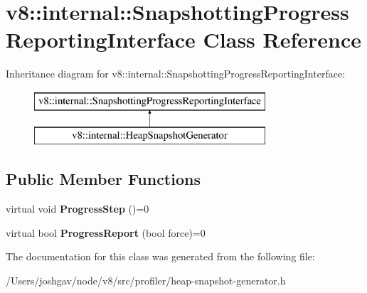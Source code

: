 \hypertarget{classv8_1_1internal_1_1_snapshotting_progress_reporting_interface}{}\section{v8\+:\+:internal\+:\+:Snapshotting\+Progress\+Reporting\+Interface Class Reference}
\label{classv8_1_1internal_1_1_snapshotting_progress_reporting_interface}
Inheritance diagram for v8\+:\+:internal\+:\+:Snapshotting\+Progress\+Reporting\+Interface\+:\begin{figure}[H]
\begin{center}
\leavevmode
\includegraphics[height=2.000000cm]{classv8_1_1internal_1_1_snapshotting_progress_reporting_interface}
\end{center}
\end{figure}
\subsection*{Public Member Functions}
\begin{DoxyCompactItemize}
\item 
virtual void {\bfseries Progress\+Step} ()=0\hypertarget{classv8_1_1internal_1_1_snapshotting_progress_reporting_interface_abdd2a80e9a6dbbcfc3f8e510444c7acd}{}\label{classv8_1_1internal_1_1_snapshotting_progress_reporting_interface_abdd2a80e9a6dbbcfc3f8e510444c7acd}

\item 
virtual bool {\bfseries Progress\+Report} (bool force)=0\hypertarget{classv8_1_1internal_1_1_snapshotting_progress_reporting_interface_a2b81b8715eac64dfee24b32cc3b1ed48}{}\label{classv8_1_1internal_1_1_snapshotting_progress_reporting_interface_a2b81b8715eac64dfee24b32cc3b1ed48}

\end{DoxyCompactItemize}


The documentation for this class was generated from the following file\+:\begin{DoxyCompactItemize}
\item 
/\+Users/joshgav/node/v8/src/profiler/heap-\/snapshot-\/generator.\+h\end{DoxyCompactItemize}

